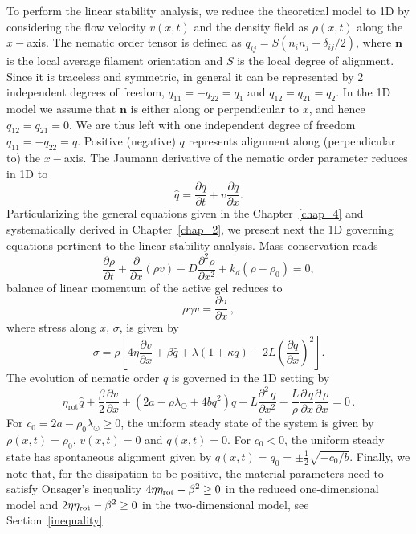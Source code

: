 To perform the linear stability analysis, we reduce the theoretical model to 1D  by considering the flow velocity $v(x,t)$  and the density field as $\rho(x,t)$ along the $x-$axis. The nematic order tensor is defined as $q_{ij} = S(n_i n_j - \delta_{ij}/2)$, where $\bm{n}$ is the local average filament orientation and $S$ is the local degree of alignment. Since it is traceless and symmetric, in general it can be represented by 2 independent degrees of freedom, $q_{11}=-q_{22}=q_1$ and $q_{12}=q_{21}=q_2$. In the 1D model we assume that $\bm{n}$ is either along or perpendicular to $x$, and hence $q_{12}=q_{21}=0$. We are thus left with one independent degree of freedom $q_{11}=-q_{22}=q$. Positive (negative) $q$ represents alignment along (perpendicular to) the $x-$axis. The Jaumann derivative of the nematic order parameter reduces in 1D to
\begin{equation}
	\hat{q}=\frac{\partial q}{\partial t} + v \frac{\partial q}{\partial x}.
\end{equation}
Particularizing the general equations given in the Chapter~\ref{chap_4} and systematically derived in Chapter~\ref{chap_2}, we present next the 1D governing equations pertinent to the linear stability analysis. Mass conservation reads
\begin{equation} \label{eq_1D_thick}
	\frac{\partial \rho }{\partial t}  + \frac{\partial}{\partial x} \left( \rho v \right)   -  D \frac{\partial^2 \rho}{\partial x^2}  + k_d (\rho-\rho_0)=0,
\end{equation}
balance of linear momentum of the active gel reduces to
\begin{equation} \label{eq_1D_force_balance}
	\rho \gamma   v =    \frac{\partial \sigma}{\partial x}   \, ,
\end{equation}
where stress along $x$, $\sigma$, is given by
\begin{equation} \label{eq_1D_stress}
	\sigma = \rho \left[  4 \eta \frac{\partial v}{\partial x}+ \beta  \hat{q}  +  \lambda \left( 1+\kappa q \right) - 2L \left( \frac{\partial q}{\partial x}\right)^2  \right].
\end{equation}
The evolution of nematic order $q$ is governed in the 1D setting by
\begin{equation} \label{eq_1D_torque}
	\eta_{\text{rot}} \hat{q} + \frac{\beta}{2} \frac{\partial v}{\partial x}+\left(2a - \rho \lambda_{\odot}+ 4bq^2\right)q - L \frac{\partial^2 \, q}{\partial x^2} - \frac{L}{\rho} \frac{\partial \, q}{\partial x} \frac{\partial \, \rho}{\partial x} = 0 \, .
\end{equation}
For $c_0=2a-\rho_0 \lambda_{\odot} \ge 0$, the uniform steady state of the system is given by $\rho(x,t) = \rho_0$, $v(x,t)=0$ and $q(x,t) = 0$. For $c_0<0$, the uniform steady state has spontaneous alignment given by  $q(x,t) = q_0 = \pm \frac{1}{2} \sqrt{-c_0/b}$. Finally, we note that, for the dissipation to be positive, the material parameters need to satisfy Onsager's inequality $4\eta \eta_{\rm rot} - \beta^2 \ge 0$ in the reduced one-dimensional model and  $2\eta \eta_{\rm rot} - \beta^2 \ge 0$ in the two-dimensional model, see Section~\ref{inequality}.

